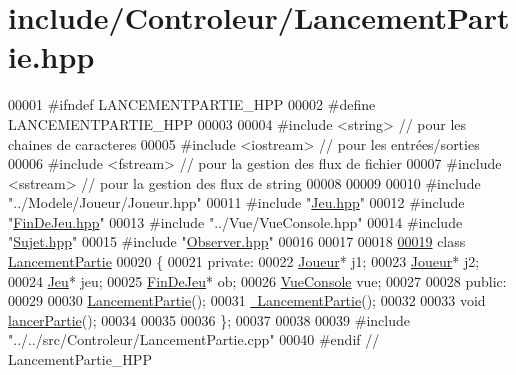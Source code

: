 \hypertarget{_lancement_partie_8hpp_source}{\section{include/\-Controleur/\-Lancement\-Partie.hpp}
}

\begin{DoxyCode}
00001 \textcolor{preprocessor}{#ifndef LANCEMENTPARTIE\_HPP}
00002 \textcolor{preprocessor}{}\textcolor{preprocessor}{#define LANCEMENTPARTIE\_HPP}
00003 \textcolor{preprocessor}{}
00004 \textcolor{preprocessor}{#include <string>} \textcolor{comment}{// pour les chaines de caracteres}
00005 \textcolor{preprocessor}{#include <iostream>} \textcolor{comment}{// pour les entrées/sorties}
00006 \textcolor{preprocessor}{#include <fstream>} \textcolor{comment}{// pour la gestion des flux de fichier}
00007 \textcolor{preprocessor}{#include <sstream>} \textcolor{comment}{// pour la gestion des flux de string}
00008 
00009 
00010 \textcolor{preprocessor}{#include "../Modele/Joueur/Joueur.hpp"}
00011 \textcolor{preprocessor}{#include "\hyperlink{_jeu_8hpp}{Jeu.hpp}"}
00012 \textcolor{preprocessor}{#include "\hyperlink{_fin_de_jeu_8hpp}{FinDeJeu.hpp}"}
00013 \textcolor{preprocessor}{#include "../Vue/VueConsole.hpp"}
00014 \textcolor{preprocessor}{#include "\hyperlink{_sujet_8hpp}{Sujet.hpp}"}
00015 \textcolor{preprocessor}{#include "\hyperlink{_observer_8hpp}{Observer.hpp}"}
00016 
00017 
00018 
\hypertarget{_lancement_partie_8hpp_source_l00019}{}\hyperlink{class_lancement_partie}{00019} \textcolor{keyword}{class }\hyperlink{class_lancement_partie}{LancementPartie}
00020 \{
00021     \textcolor{keyword}{private}:
00022         \hyperlink{class_joueur}{Joueur}* j1;
00023         \hyperlink{class_joueur}{Joueur}* j2;
00024         \hyperlink{class_jeu}{Jeu}* jeu;
00025         \hyperlink{class_fin_de_jeu}{FinDeJeu}* ob;
00026         \hyperlink{class_vue_console}{VueConsole} vue;
00027         
00028     \textcolor{keyword}{public}: 
00029     
00030         \hyperlink{class_lancement_partie_a15c4cd0df7b7b7cd47c26b0f8782adee}{LancementPartie}();
00031         \hyperlink{class_lancement_partie_a21f3576e8d380d0fd684d5851787bed0}{~LancementPartie}();
00032         
00033         \textcolor{keywordtype}{void} \hyperlink{class_lancement_partie_af84e88126249dfdcbbac1daa329f4ce3}{lancerPartie}();
00034         
00035         
00036 \};
00037 
00038 
00039 \textcolor{preprocessor}{#include "../../src/Controleur/LancementPartie.cpp"}
00040 \textcolor{preprocessor}{#endif // LancementPartie\_HPP       }
\end{DoxyCode}
